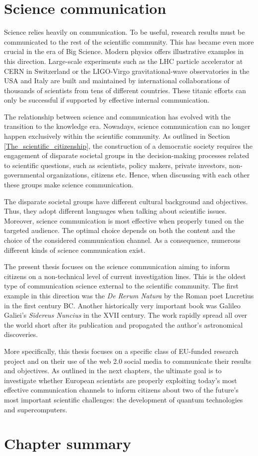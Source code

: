 \section{Science communication}    
Science relies heavily on communication. To be useful, research results must be communicated to the rest of the scientific community. This has became even more crucial in the era of Big Science. Modern physics offers illustrative examples in this direction. Large-scale experiments such as the LHC particle accelerator at CERN in Switzerland or the LIGO-Virgo gravitational-wave observatories in the USA and Italy are built and maintained by international collaborations of thousands of scientists from tens of different countries. These titanic efforts can only be successful if supported by effective internal communication.  

The relationship between science and communication has evolved with the transition to the knowledge era. Nowadays, science communication can no longer happen exclusively within the scientific community. As outlined in Section \ref{The_scientific_citizenship}, the construction of a democratic society requires the engagement of disparate societal groups in the decision-making processes related to scientific questions, such as scientists, policy makers, private investors, non-governmental organizations, citizens etc. Hence, when discussing with each other these groups make science communication.

The disparate societal groups have different cultural background and objectives. Thus, they adopt different languages when talking about scientific issues. Moreover, science communication is most effective when properly tuned on the targeted audience. The optimal choice depends on both the content and the choice of the considered communication channel. As a consequence, numerous different kinds of science communication exist.   

The present thesis focuses on the science communication aiming to inform citizens on a non-technical level of current investigation lines. This is the oldest type of communication science external to the scientific community. The first example in this direction was the \textit{De Rerum Natura} by the Roman poet Lucretius in the first century BC. Another historically very important book was Galileo Galiei's \textit{Sidereus Nuncius} in the XVII century. The work rapidly spread all over the world short after its publication and propagated the author's astronomical discoveries.

More specifically, this thesis focuses on a specific class of EU-funded research project and on their use of the web 2.0 social media to communicate their results and objectives. As outlined in the next chapters, the ultimate goal is to investigate whether European scientists are properly exploiting today's most effective communication channels to inform citizens about two of the future's most important scientific challenges: the development of quantum technologies and supercomputers.

\section{Chapter summary} 